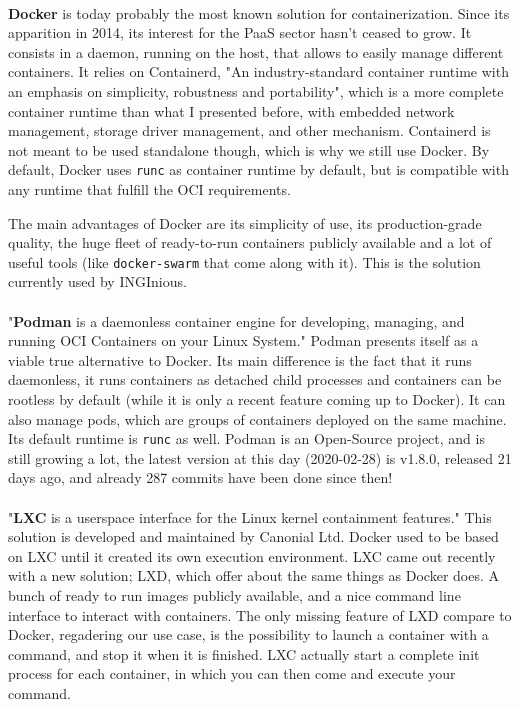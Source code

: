 \paragraph{}\textbf{Docker}\cite{merkel2014docker} is today probably the most known solution for containerization.  Since its apparition in 2014, its interest for the PaaS sector hasn't ceased to grow.  It consists in a daemon, running on the host, that allows to easily manage different containers.  It relies on Containerd, "An industry-standard container runtime with an emphasis on simplicity, robustness and portability"\cite{containerd}, which is a more complete container runtime than what I presented before, with embedded network management, storage driver management, and other mechanism.  Containerd is not meant to be used standalone though, which is why we still use Docker.  By default, Docker uses \texttt{runc} as container runtime by default, but is compatible with any runtime that fulfill the OCI\cite{oci} requirements.

The main advantages of Docker are its simplicity of use, its production-grade quality, the huge fleet of ready-to-run containers publicly available and a lot of useful tools (like \texttt{docker-swarm} that come along with it).  This is the solution currently used by INGInious.

\paragraph{}"\textbf{Podman} is a daemonless container engine for developing, managing, and running OCI\cite{oci} Containers on your Linux System."\cite{podman}  Podman presents itself as a viable true alternative to Docker.  Its main difference is the fact that it runs daemonless, it runs containers as detached child processes and containers can be rootless by default (while it is only a recent feature coming up to Docker).  It can also manage pods, which are groups of containers deployed on the same machine. Its default runtime is \texttt{runc} as well.  Podman is an Open-Source project, and is still growing a lot, the latest version at this day (2020-02-28) is v1.8.0, released 21 days ago, and already 287 commits have been done since then!

\paragraph{}"\textbf{LXC} is a userspace interface for the Linux kernel containment features."\cite{lxc}  This solution is developed and maintained by Canonial Ltd.  Docker used to be based on LXC until it created its own execution environment.  LXC came out recently with a new solution; LXD, which offer about the same things as Docker does.  A bunch of ready to run images publicly available, and a nice command line interface to interact with containers.  The only missing feature of LXD compare to Docker, regadering our use case, is the possibility to launch a container with a command, and stop it when it is finished.  LXC actually start a complete init process for each container, in which you can then come and execute your command.

